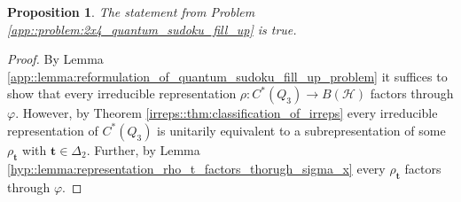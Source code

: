 \documentclass[a4paper]{amsart}
\newtheorem{proposition}[thm]{Proposition}
\begin{document}
\begin{proposition}
    \label{hyp::prop:quantum_sudoku_fill_up}
    The statement from Problem \ref{app::problem:2x4_quantum_sudoku_fill_up} is true.
\end{proposition}

\begin{proof}
    By Lemma \ref{app::lemma:reformulation_of_quantum_sudoku_fill_up_problem} it suffices to show that every irreducible representation $\rho: C^\ast(Q_3) \to B(\mathcal{H})$ factors through $\varphi$.
    However, by Theorem \ref{irreps::thm:classification_of_irreps} every irreducible representation of $C^\ast(Q_3)$ is unitarily equivalent to a subrepresentation of some $\rho_{\mathbf{t}}$ with $\mathbf{t} \in \Delta_2$. Further, by Lemma \ref{hyp::lemma:representation_rho_t_factors_thorugh_sigma_x} every $\rho_{\mathbf{t}}$ factors through $\varphi$. 
\end{proof}

\printbibliography
\end{document}
